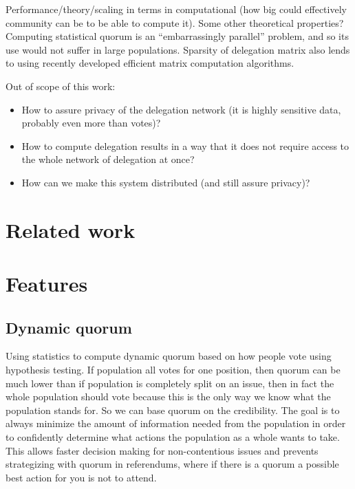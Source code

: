 \documentclass{sigchi}
\begin{document}
Performance/theory/scaling in terms in computational (how big could effectively community can be to be able to compute it).
Some other theoretical properties?
Computing statistical quorum is an ``embarrassingly parallel'' problem, and so its
use would not suffer in large populations.
Sparsity of delegation matrix also lends to using recently developed
efficient matrix computation algorithms.

Out of scope of this work:

\begin{itemize}
\item How to assure privacy of the delegation network (it is highly sensitive data, probably even more than votes)?
\item How to compute delegation results in a way that it does not require access to the whole network of delegation at once?
\item How can we make this system distributed (and still assure privacy)?
\end{itemize}

\section{Related work}

\cite{andersen2008trust, dirnstorfer2010voting, ford2002delegative, rodriguez2007smartocracy, yamakawa2007toward}

\section{Features}

\subsection{Dynamic quorum}

Using statistics to compute dynamic quorum based on how people vote using hypothesis testing.
If population all votes for one position, then quorum can be much lower than if population is completely split on an
issue, then in fact the whole population should vote because this is the only way we know what the population stands for.
So we can base quorum on the credibility.
The goal is to always minimize the amount of information needed from
the population in order to confidently determine what actions the population as a whole wants to take.
This allows faster decision making for non-contentious issues and prevents strategizing with quorum in
referendums, where if there is a quorum a possible best action for you is not to attend.
\end{document}
